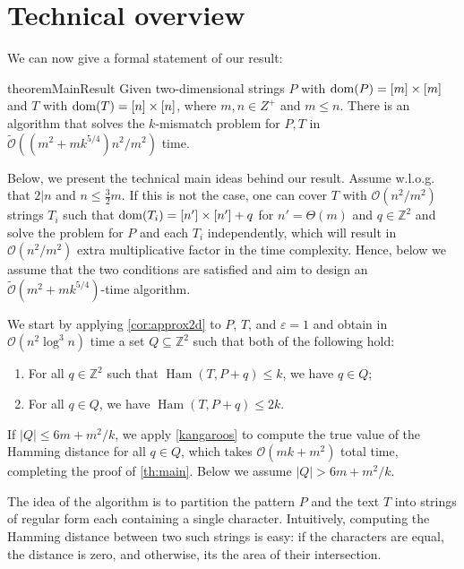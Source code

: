 \documentclass[11pt, letterpaper]{article}
\theoremstyle{plain}
\theoremstyle{definition}
\theoremstyle{remark}
\newcommand{\Z}{\mathbb{Z}}
\renewcommand{\O}{\mathcal{O}}
\newcommand{\tO}{\tilde{\mathcal{O}}}
\DeclareMathOperator*{\Ham}{Ham}
\begin{document}

\section{Technical overview}
We can now give a formal statement of our result:

\begin{restatable}{theorem}{MainResult}\label{th:main}
Given two-dimensional strings $P$ with $\operatorname*{dom}(P) = [m] \times [m]$ and $T$ with $\operatorname*{dom}(T) = [n] \times [n]$, where $m,n\in Z^+$ and $m \le n$. There is an algorithm that solves the $k$-mismatch problem for $P,T$ in $\tO((m^2 + mk^{5/4})n^2 / m^2)$ time.
\end{restatable}

Below, we present the technical main ideas behind our result. Assume w.l.o.g. that $2|n$ and $n \le \frac{3}{2}m$. If this is not the case, one can cover $T$ with $\O(n^2/m^2)$ strings $T_i$ such that $\operatorname*{dom}(T_i) = [n'] \times [n'] + q$ for $n' = \Theta(m)$ and $q \in \Z^2$ and solve the problem for $P$ and each $T_i$ independently, which will result in $\O(n^2/m^2)$ extra multiplicative factor in the time complexity. Hence, below we assume that the two conditions are satisfied and aim to design an $\tO(m^2 + mk^{5/4})$-time algorithm. 

We start by applying \cref{cor:approx2d} to $P$, $T$, and $\varepsilon = 1$ and obtain in $\O(n^2 \log^3 n)$ time a set $Q \subseteq \Z^2$ such that both of the following hold:
\begin{enumerate}
\item For all $q \in \Z^2$ such that $\Ham(T, P+q) \le k$, we have $q \in Q$;
\item For all $q \in Q$, we have $\Ham(T, P+q) \le 2 k$.
\end{enumerate}

If $|Q| \le 6m + m^2/k$, we apply \cref{kangaroos} to compute the true value of the Hamming distance for all $q \in Q$, which takes $\O(mk+m^2)$ total time, completing the proof of \cref{th:main}. Below we assume $|Q| > 6m + m^2/k$. 

The idea of the algorithm is to partition the pattern $P$ and the text $T$ into strings of regular form each containing a single character. Intuitively, computing the Hamming distance between two such strings is easy: if the characters are equal, the distance is zero, and otherwise, its the area of their intersection.
\end{document}
